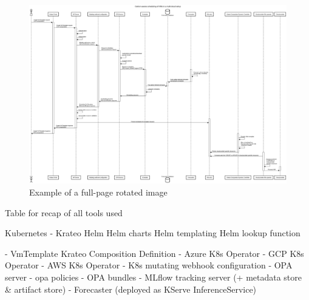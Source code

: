 \begin{figure}
  \centering
  \includegraphics[width=\textheight]{images/sequence_diagram.png}
  \caption{Example of a full-page rotated image}
  \label{fig:rotated_image}
\end{figure}


\newpage







Table for recap of all tools used

Kubernetes
- Krateo
Helm
    Helm charts
    Helm templating
    Helm lookup function

- VmTemplate Krateo Composition Definition
- Azure K8s Operator
- GCP K8s Operator
- AWS K8s Operator
- K8s mutating webhook configuration
- OPA server
- opa policies
- OPA bundles
- MLflow tracking server (+ metadata store & artifact store)
- Forecaster (deployed as KServe InferenceService)


\newpage
